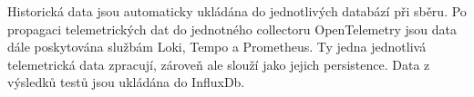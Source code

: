 Historická data jsou automaticky ukládána do jednotlivých databází při sběru. Po propagaci telemetrických dat do jednotného collectoru OpenTelemetry jsou data dále poskytována službám Loki, Tempo a Prometheus. Ty jedna jednotlivá telemetrická data zpracují, zároveň ale slouží jako jejich persistence. Data z výsledků testů jsou ukládána do InfluxDb.







